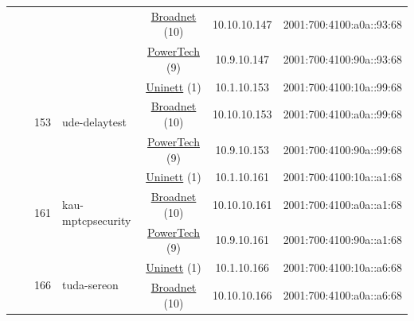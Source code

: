 \begin{small}
\begin{center}
\begin{longtable}{|c|c|c|c|c|c|c|c|}
  &  &  &  & \multicolumn{2}{|c|}{\tiny{\href{https://www.broadnet.no}{Broadnet} (10)}} & \tiny{10.10.10.147} & \tiny{2001:700:4100:a0a::93:68} \\* \cline{5-5}\cline{6-6}\cline{7-7}\cline{8-8}
  &  &  &  & \multicolumn{2}{|c|}{\tiny{\href{http://www.powertech.no}{PowerTech} (9)}} & \tiny{10.9.10.147} & \tiny{2001:700:4100:90a::93:68} \\* \cline{3-3}\cline{4-4}\cline{5-5}\cline{6-6}\cline{7-7}\cline{8-8}
  &  & \multirow{3}{*}{\tiny{153}} & \multicolumn{1}{|l|}{\multirow{3}{*}{\tiny{ude-delaytest}}} & \multicolumn{2}{|c|}{\tiny{\href{https://www.uninett.no}{Uninett} (1)}} & \tiny{10.1.10.153} & \tiny{2001:700:4100:10a::99:68} \\* \cline{5-5}\cline{6-6}\cline{7-7}\cline{8-8}
  &  &  &  & \multicolumn{2}{|c|}{\tiny{\href{https://www.broadnet.no}{Broadnet} (10)}} & \tiny{10.10.10.153} & \tiny{2001:700:4100:a0a::99:68} \\* \cline{5-5}\cline{6-6}\cline{7-7}\cline{8-8}
  &  &  &  & \multicolumn{2}{|c|}{\tiny{\href{http://www.powertech.no}{PowerTech} (9)}} & \tiny{10.9.10.153} & \tiny{2001:700:4100:90a::99:68} \\* \cline{3-3}\cline{4-4}\cline{5-5}\cline{6-6}\cline{7-7}\cline{8-8}
  &  & \multirow{3}{*}{\tiny{161}} & \multicolumn{1}{|l|}{\multirow{3}{*}{\tiny{kau-mptcpsecurity}}} & \multicolumn{2}{|c|}{\tiny{\href{https://www.uninett.no}{Uninett} (1)}} & \tiny{10.1.10.161} & \tiny{2001:700:4100:10a::a1:68} \\* \cline{5-5}\cline{6-6}\cline{7-7}\cline{8-8}
  &  &  &  & \multicolumn{2}{|c|}{\tiny{\href{https://www.broadnet.no}{Broadnet} (10)}} & \tiny{10.10.10.161} & \tiny{2001:700:4100:a0a::a1:68} \\* \cline{5-5}\cline{6-6}\cline{7-7}\cline{8-8}
  &  &  &  & \multicolumn{2}{|c|}{\tiny{\href{http://www.powertech.no}{PowerTech} (9)}} & \tiny{10.9.10.161} & \tiny{2001:700:4100:90a::a1:68} \\* \cline{3-3}\cline{4-4}\cline{5-5}\cline{6-6}\cline{7-7}\cline{8-8}
  &  & \multirow{3}{*}{\tiny{166}} & \multicolumn{1}{|l|}{\multirow{3}{*}{\tiny{tuda-sereon}}} & \multicolumn{2}{|c|}{\tiny{\href{https://www.uninett.no}{Uninett} (1)}} & \tiny{10.1.10.166} & \tiny{2001:700:4100:10a::a6:68} \\* \cline{5-5}\cline{6-6}\cline{7-7}\cline{8-8}
  &  &  &  & \multicolumn{2}{|c|}{\tiny{\href{https://www.broadnet.no}{Broadnet} (10)}} & \tiny{10.10.10.166} & \tiny{2001:700:4100:a0a::a6:68} \\* \cline{5-5}\cline{6-6}\cline{7-7}\cline{8-8}

\end{longtable}
\end{center}
\end{small}
